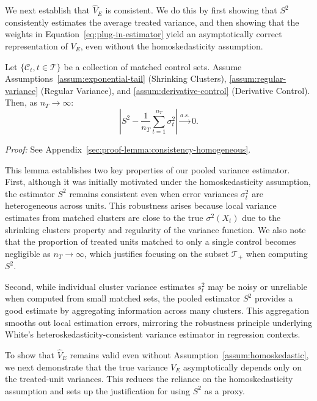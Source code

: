 \documentclass{mytemplate}
\begin{document}
We next establish that $\hat{V}_E$ is consistent. We do this by first showing that $S^2$ consistently estimates the average treated variance, and then showing that the weights in Equation~\ref{eq:plug-in-estimator} yield an asymptotically correct representation of $V_E$, even without the homoskedasticity assumption.

\begin{lemma}
\label{lemma:consistency-homogeneous}
Let $\{\mathcal{C}_t, t\in \mathcal{T}\}$ be a collection of matched control sets. Assume Assumptions~\ref{assum:exponential-tail} (Shrinking Clusters), \ref{assum:regular-variance} (Regular Variance), and \ref{assum:derivative-control} (Derivative Control). Then, as $n_T \rightarrow \infty$:
\begin{equation}
\label{eq:consistency-homogeneity}
    \left|S^2 - \frac{1}{n_T} \sum_{t=1}^{n_T} \sigma_t^2\right| \xrightarrow{a.s.} 0.
\end{equation}
\end{lemma}

\textit{Proof:} See Appendix~\ref{sec:proof-lemma:consistency-homogeneous}.

This lemma establishes two key properties of our pooled variance estimator. First, although it was initially motivated under the homoskedasticity assumption, the estimator $S^2$ remains consistent even when error variances $\sigma_t^2$ are heterogeneous across units. This robustness arises because local variance estimates from matched clusters are close to the true $\sigma^2(X_t)$ due to the shrinking clusters property and regularity of the variance function. We also note that the proportion of treated units matched to only a single control becomes negligible as $n_T \to \infty$, which justifies focusing on the subset $\mathcal{T}_+$ when computing $S^2$.


Second, while individual cluster variance estimates $s_t^2$ may be noisy or unreliable when computed from small matched sets, the pooled estimator $S^2$ provides a good estimate by aggregating information across many clusters. This aggregation smooths out local estimation errors, mirroring the robustness principle underlying White's heteroskedasticity-consistent variance estimator in regression contexts.


To show that $\hat{V}_E$ remains valid even without Assumption~\ref{assum:homoskedastic}, we next demonstrate that the true variance $V_E$ asymptotically depends only on the treated-unit variances. This reduces the reliance on the homoskedasticity assumption and sets up the justification for using $S^2$ as a proxy.
\end{document}
